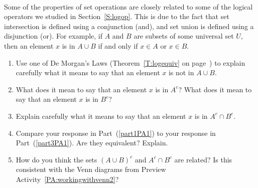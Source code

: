 \begin{previewactivity} \label{PA:workingwithdef} \hfill \\
Some of the properties of set operations are closely related to some of the logical operators we studied in Section~\ref{S:logop}.  This is due to the fact that set intersection is defined using a conjunction (and), and set union is defined using a disjunction (or).  For example, if  $A$  and  $B$ are subsets of some universal set  $U$, then an element  $x$  is in  $A \cup B$  if and only if  $x \in A$  or  $x \in B$.


%

\begin{enumerate}
  \item Use one of De Morgan's Laws (Theorem~\ref{T:logequiv} on page~\pageref{T:logequiv}) to explain carefully what it means to say that an element  $x$  is not in  $A \cup B$. 
\label{part1PA1}
  \item What does it mean to say that an element  $x$  is in  $A^c $? What does it mean to say that an element  $x$  is in  $B^c $? 
  \item Explain carefully what it means to say that an element  $x$   is in  $A^c  \cap B^c $. \label{part3PA1}
  \item Compare your response in Part~(\ref{part1PA1}) to your response in Part~(\ref{part3PA1}).  Are they equivalent?  Explain.
  \item How do you think the sets  $\left( {A \cup B} \right)^c $ and $A^c  \cap B^c $ are related?  Is this consistent with the Venn diagrams from Preview Activity~\ref{PA:workingwithvenn2}?
\end{enumerate}
\end{previewactivity}
\hbreak
%

